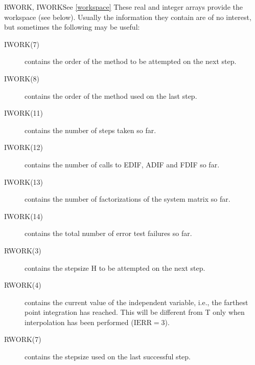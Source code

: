 \begin{entry}{RWORK, IWORK}{See \ref{workspace}}
  These real and integer arrays provide the workspace (see below).
  Usually the information they contain are of no interest, but
  sometimes the following may be useful:
  \begin{description}
  \item[IWORK(7)] contains the order of the method to be
    attempted on the next step.
  \item[IWORK(8)] contains the order of the method used on the
    last step.
  \item[IWORK(11)] contains the number of steps taken so far.
  \item[IWORK(12)] contains the number of calls to EDIF, ADIF
    and FDIF so far.
  \item[IWORK(13)] contains the number of factorizations of the
    system matrix so far.
  \item[IWORK(14)] contains the total number of error test
    failures so far.
  \item[RWORK(3)]  contains the stepsize H to be attempted on
    the next step.
  \item[RWORK(4)] contains the current value of the independent
    variable, i.e., the farthest point integration has reached. This
    will be different from T only when interpolation has been
    performed ($\mbox{IERR}=3$).
  \item[RWORK(7)] contains the stepsize used on the last
    successful step.
  \end{description}
\end{entry}

